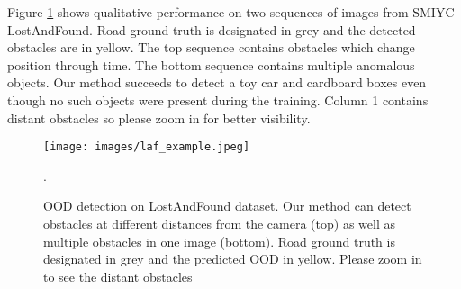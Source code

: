 \documentclass[lettersize,journal,hidelinks]{IEEEtran}
\begin{document}
Figure \ref{fig:lf-ood} shows qualitative performance on two sequences of images from SMIYC LostAndFound.
Road ground truth is designated in grey and the detected obstacles are in yellow.
The top sequence contains obstacles which change position through time.
The bottom sequence contains multiple anomalous objects.
Our method succeeds to detect a toy car and cardboard boxes even though no such objects were present during the training.
Column 1 contains distant obstacles so please zoom in for better visibility.
\begin{figure}[ht]
    \centering
    \texttt{[image: images/laf\_example.jpeg]}
    \caption{OOD detection on LostAndFound dataset. Our method can detect obstacles at different distances from the camera (top) as well as multiple obstacles in one image (bottom). Road ground truth is designated in grey and the predicted OOD in yellow. Please zoom in to see the distant obstacles}.
    \label{fig:lf-ood}
\end{figure}
\end{document}
